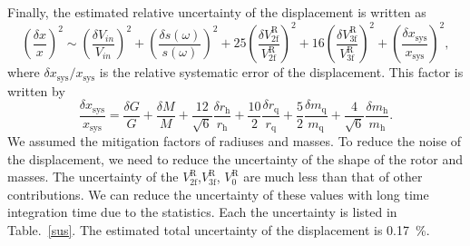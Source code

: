 \documentclass[%
 reprint,
superscriptaddress,
 amsmath,amssymb,
 aps,
]{revtex4-1}
\begin{document}
 Finally, the estimated relative uncertainty of the displacement is written as
 \footnotesize
\begin{equation}
\left( \frac{\delta x}{x} \right)^2 \!\sim \! \left( \!\frac{\delta V_{in}}{V_{in}}\! \right)^2+\left(\! \frac{\delta s(\omega)}{s(\omega)} \! \right)^2\!+\!25\!\left(\!\frac{\delta V^{\mathrm{R}}_{{\mathrm{2f}}}}{V^{\mathrm{R}}_{{\mathrm{2f}}}}\! \right)^2+16\!\left(\! \frac{\delta V^{\mathrm{R}}_{{\mathrm{3f}}}}{V^{\mathrm{R}}_{{\mathrm{3f}}}}\! \right)^2\!+ \left(\! \frac{\delta x_{\mathrm{sys}}}{x_{\mathrm{sys}}} \! \right)^2 \label{deltax},
\end{equation}
\normalsize
where $\delta x_{\mathrm{sys}}/x_{\mathrm{sys}}$ is the relative systematic error of the displacement. This factor is written by
 \footnotesize
\begin{equation}
\frac{\delta x_{\mathrm{sys}}}{x_{\mathrm{sys}}}=\frac{\delta G}{G} + \frac{\delta M}{M} +\frac{12}{\sqrt{6}} \frac{\delta r_{\mathrm{h}}}{r_{\mathrm{h}}} +\frac{10}{2} \frac{\delta r_{\mathrm{q}}}{r_{\mathrm{q}}}  +\frac{5}{2} \frac{\delta m_{\mathrm{q}}}{m_{\mathrm{q}}} +\!\frac{4}{\sqrt{6}}  \! \frac{\delta m_{\mathrm{h}}}{m_{\mathrm{h}}}.
\end{equation}
\normalsize
We assumed the mitigation factors of radiuses and masses.
To reduce the noise of the displacement, we need to reduce the uncertainty of the shape of the rotor and masses.
The uncertainty of the $V^{\mathrm{R}}_{\mathrm{2f}}$,$V^{\mathrm{R}}_{\mathrm{3f}}$, $V^{\mathrm{R}}_{0}$ are much less than that of other contributions. We can reduce the uncertainty of these values with long time integration time due to the statistics. Each the uncertainty is listed in Table.~\ref{sus}. The estimated  total uncertainty of the displacement is 0.17~\%.

\end{document}
